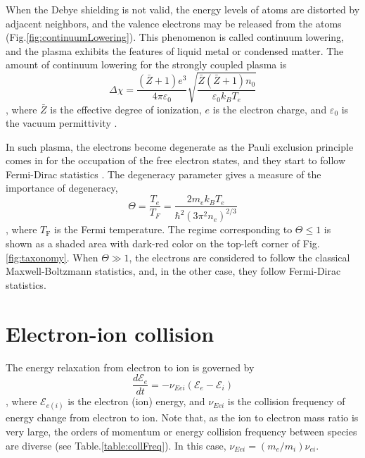 When the Debye shielding is not valid, the energy levels of atoms are distorted by adjacent neighbors, and the valence electrons may be released from the atoms (Fig.\ref{fig:continuumLowering}). This phenomenon is called continuum lowering, and the plasma exhibits the features of liquid metal or condensed matter. The amount of continuum lowering for the strongly coupled plasma is \cite{griem1962high, bataller2014blackbody}
\begin{equation}
\Delta \chi = \frac{(\bar{Z}+1) e^{3}}{4 \pi \varepsilon_{0}} \sqrt{\frac{\bar{Z}(\bar{Z}+1) n_{0}}{\varepsilon_{0} k_{B} T_{e}}}
\label{eq:lowering}
\end{equation}
, where $\bar{Z}$ is the effective degree of ionization, $e$ is the electron charge, and $\varepsilon_0$ is the vacuum permittivity \cite{bataller2014blackbody, griem1962high}.

In such plasma, the electrons become degenerate as the Pauli exclusion principle comes in for the occupation of the free electron states, and they start to follow Fermi-Dirac statistics \cite{murillo2004strongly}. The degeneracy parameter gives a measure of the importance of degeneracy,
\begin{equation}
\Theta=\frac{T_{e}}{T_{F}}=\frac{2 m_{e} k_{B} T_{e}}{\hbar^{2}\left(3 \pi^{2} n_{e}\right)^{2 / 3}}
\end{equation}
, where $T_\text{F}$ is the Fermi temperature.
The regime corresponding to $\Theta \leq 1$ is shown as a shaded area with dark-red color on the top-left corner of Fig.\ref{fig:taxonomy}. When $\Theta \gg 1$, the electrons are considered to follow the classical Maxwell-Boltzmann statistics, and, in the other case, they follow Fermi-Dirac statistics.



\section{Electron-ion collision}
\label{sec:ch3-2}

The energy relaxation from electron to ion is governed by
\begin{equation}
\frac{d \mathcal{E}_e}{d t}=-\nu_{Eei}\left(\mathcal{E}_{e}-\mathcal{E}_{i}\right)
\end{equation}
, where $\mathcal{E}_{e(i)}$ is the electron (ion) energy, and $\nu_{Eei}$ is the collision frequency of energy change from electron to ion. Note that, as the ion to electron mass ratio is very large, the orders of momentum or energy collision frequency between species are diverse (see Table.\ref{table:collFreq}). In this case, $\nu_{Eei} = \left( m_e/m_i \right) \nu_{ei}$.

